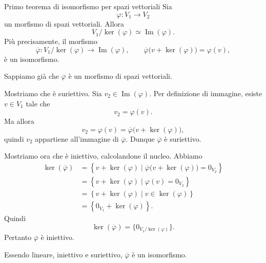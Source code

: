 \documentclass[a4paper]{article}
\begin{document}
\begin{radioactive}
\begin{snippettheorem}{Primo teorema di isomorfismo per spazi vettoriali}
    Sia
    \[
        \varphi \colon V_1 \to V_2
    \]
    un morfismo di spazi vettoriali.
    Allora
    \[
        V_1/\ker(\varphi)
        \simeq
        \operatorname{Im}(\varphi).
    \]
    Più precisamente, il morfismo
    \[
        \overline{\varphi}
        \colon
        V_1/\ker(\varphi)
        \to
        \operatorname{Im}(\varphi),
        \qquad
        \overline{\varphi}\big(v+\ker(\varphi)\big)=\varphi(v),
    \]
    è un isomorfismo.
\end{snippettheorem}
\end{radioactive}

\begin{radioactive}
\begin{snippetproof}{}
    Sappiamo già che \(\overline{\varphi}\) è un morfismo di spazi vettoriali.

    Mostriamo che è suriettivo.
    Sia \(v_2 \in \operatorname{Im}(\varphi)\). Per definizione di immagine, esiste \(v \in V_1\) tale che
    \[
        v_2=\varphi(v).
    \]
    Ma allora
    \[
        v_2
        =
        \varphi(v)
        =
        \overline{\varphi}\big(v+\ker(\varphi)\big),
    \]
    quindi \(v_2\) appartiene all'immagine di \(\overline{\varphi}\).
    Dunque \(\overline{\varphi}\) è suriettivo.

    Mostriamo ora che è iniettivo, calcolandone il nucleo.
    Abbiamo
    \begin{align*}
        \ker(\overline{\varphi})
        &=
        \left\{
            v+\ker(\varphi)
            \mid
            \overline{\varphi}\big(v+\ker(\varphi)\big)=0_{V_2}
        \right\} \\
        &=
        \left\{
            v+\ker(\varphi)
            \mid
            \varphi(v)=0_{V_2}
        \right\} \\
        &=
        \left\{
            v+\ker(\varphi)
            \mid
            v \in \ker(\varphi)
        \right\} \\
        &=
        \left\{
            0_{V_1}+\ker(\varphi)
        \right\}.
    \end{align*}
    Quindi
    \[
        \ker(\overline{\varphi})
        =
        \{0_{V_1/\ker(\varphi)}\}.
    \]
    Pertanto \(\overline{\varphi}\) è iniettivo.

    Essendo lineare, iniettivo e suriettivo, \(\overline{\varphi}\) è un isomorfismo.
\end{snippetproof}
\end{radioactive}
\end{document}
